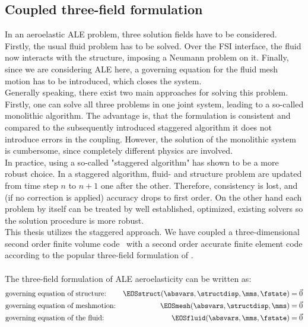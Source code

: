 \documentclass[../main.tex]{subfiles}
\begin{document}
\subsection{Coupled three-field formulation}\label{sec:3_field_formulation}
In an aeroelastic ALE problem, three solution fields have to be considered. Firstly, the usual fluid problem has to be solved. Over the \ac{FSI} interface, the fluid now interacts with the structure, imposing a Neumann problem on it. Finally, since we are considering \ac{ALE} here, a governing equation for the fluid mesh motion has to be introduced, which closes the system.\\
Generally speaking, there exist two main approaches for solving this problem. Firstly, one can solve all three problems in one joint system, leading to a so-called monolithic algorithm. The advantage is, that the formulation is consistent and compared to the subsequently introduced staggered algorithm it does not introduce errors in the coupling. However, the solution of the monolithic system is cumbersome, since completely different physics are involved.\\
In practice, using a so-called "staggered algorithm" has shown to be a more robust choice. In a staggered algorithm, fluid- and structure problem are updated from time step $n$ to $n+1$ one after the other. Therefore, consistency is lost, and (if no correction is applied) accuracy drops to first order. On the other hand each problem by itself can be treated by well established, optimized, existing solvers so the solution procedure is more robust.\\
This thesis utilizes the staggered approach. We have coupled a three-dimensional second order finite volume code~\cite{Aerof} with a second order accurate finite element code\cite{Aeros} according to the popular three-field formulation of \cite{Farhat1995}.\\
 \\
The three-field formulation of \ac{ALE} aeroelasticity can be written as:
\begin{align}
&\text{governing equation of structure:}  &\EOSstruct (\absvars,\structdisp,\mms,\fstate) = \vec{0} \label{eq:3field_structure}\\
&\text{governing equation of meshmotion:} &\EOSmesh   (\absvars,\structdisp,\mms)         = \vec{0} \label{eq:3field_mesh}\\
&\text{governing equation of the fluid:}  &\EOSfluid  (\absvars,\mms,\fstate)             = \vec{0} \label{eq:3field_fluid}
\end{align}
\end{document}
